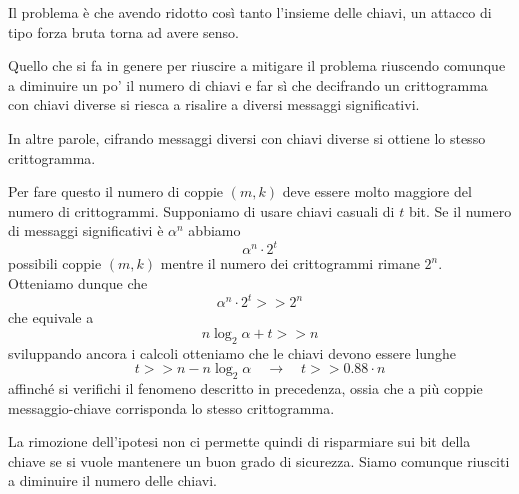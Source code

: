 Il problema \`e che avendo ridotto cos\`i tanto l'insieme delle chiavi, un attacco di tipo forza bruta torna ad avere
senso.

Quello che si fa in genere per riuscire a mitigare il problema riuscendo comunque a diminuire un po' il numero di chiavi
e far s\`i che decifrando un crittogramma con chiavi diverse si riesca a risalire a diversi messaggi significativi.

In altre parole, cifrando messaggi diversi con chiavi diverse si ottiene lo stesso crittogramma.

Per fare questo il numero di coppie $(m, k)$ deve essere molto maggiore del numero di crittogrammi. Supponiamo di usare
chiavi casuali di $t$ bit. Se il numero di messaggi significativi \`e $\alpha^n$ abbiamo
\[ \alpha^n \cdot 2^t \]
possibili coppie $(m, k)$ mentre il numero dei crittogrammi rimane $2^n$. Otteniamo dunque che
\[ \alpha^n \cdot 2^t >> 2^n \]
che equivale a
\[ n \log_2 \alpha + t >> n \]
sviluppando ancora i calcoli otteniamo che le chiavi devono essere lunghe
\[ t >> n - n\log_2 \alpha \quad \rightarrow \quad t >> 0.88 \cdot n \]
affinch\'e si verifichi il fenomeno descritto in precedenza, ossia che a pi\`u coppie messaggio-chiave corrisponda lo
stesso crittogramma.

La rimozione dell'ipotesi non ci permette quindi di risparmiare sui bit della chiave se si vuole mantenere un buon grado
di sicurezza. Siamo comunque riusciti a diminuire il numero delle chiavi.